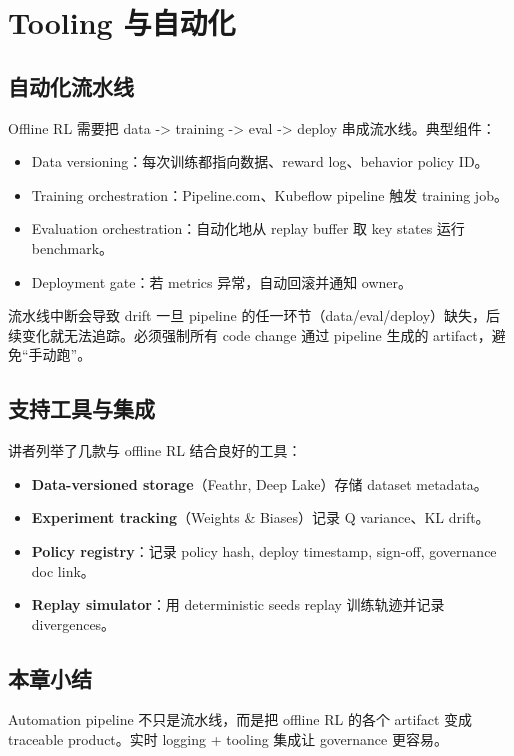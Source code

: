 \section{Tooling 与自动化}

\subsection{自动化流水线}

Offline RL 需要把 data -> training -> eval -> deploy 串成流水线。典型组件：

\begin{itemize}
    \item Data versioning：每次训练都指向数据、reward log、behavior policy ID。
    \item Training orchestration：Pipeline.com、Kubeflow pipeline 触发 training job。
    \item Evaluation orchestration：自动化地从 replay buffer 取 key states 运行 benchmark。
    \item Deployment gate：若 metrics 异常，自动回滚并通知 owner。
\end{itemize}

\begin{warningbox}{流水线中断会导致 drift}
一旦 pipeline 的任一环节（data/eval/deploy）缺失，后续变化就无法追踪。必须强制所有 code change 通过 pipeline 生成的 artifact，避免“手动跑”。
\end{warningbox}

\subsection{支持工具与集成}

讲者列举了几款与 offline RL 结合良好的工具：

\begin{itemize}
    \item \textbf{Data-versioned storage}（Feathr, Deep Lake）存储 dataset metadata。
    \item \textbf{Experiment tracking}（Weights & Biases）记录 Q variance、KL drift。
    \item \textbf{Policy registry}：记录 policy hash, deploy timestamp, sign-off, governance doc link。
    \item \textbf{Replay simulator}：用 deterministic seeds replay 训练轨迹并记录 divergences。
\end{itemize}

\subsection{本章小结}

Automation pipeline 不只是流水线，而是把 offline RL 的各个 artifact 变成 traceable product。实时 logging + tooling 集成让 governance 更容易。

